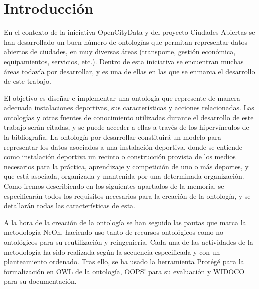 \documentclass[a4paper,12pt]{article}
\begin{document}
	
	\setlength{\parindent}{0.5cm}
	\setlength{\voffset}{-2cm}
	\setlength{\hoffset}{-2cm}
	
	
	
	\tableofcontents
	
\newpage

	\section{Introducción}
		
	En el contexto de la iniciativa OpenCityData \cite{opencitydata} y del proyecto
Ciudades Abiertas \cite{ciudadesabiertas} se han desarrollado un buen número de
ontologías que permitan representar datos abiertos de ciudades, en muy diversas áreas (transporte,
gestión económica, equipamientos, servicios, etc.). Dentro de esta iniciativa se encuentran
muchas áreas todavía por desarrollar, y es una de ellas en las que se enmarca el desarrollo de
este trabajo.
	
	El objetivo es diseñar e implementar una ontología que represente de manera adecuada
instalaciones deportivas, sus características y acciones relacionadas. Las ontologías y otras
fuentes de conocimiento utilizadas durante el desarrollo de este trabajo serán citadas, y se puede
acceder a ellas a través de los hipervínculos de la bibliografía.
La ontología por desarrollar constituirá un modelo para representar los datos asociados a una
instalación deportiva, donde se entiende como instalación deportiva un recinto o construcción provista de los medios necesarios para la práctica, aprendizaje y competición de uno o más
deportes, y que está asociada, organizada y mantenida por una determinada organización. Como
iremos describiendo en los siguientes apartados de la memoria, se especificarán todos los
requisitos necesarios para la creación de la ontología, y se detallarán todas las características de
esta.
	
	A la hora de la creación de la ontología se han seguido las pautas que marca la metodología NeOn,
haciendo uso tanto de recursos ontológicos como no ontológicos para su reutilización y
reingeniería. Cada una de las actividades de la metodología ha sido realizada según la secuencia
especificada y con un planteamiento ordenado. Tras ello, se ha usado la herramienta Protégé para
la formalización en OWL de la ontología, OOPS! para su evaluación y WIDOCO para su documentación.
	
\end{document}

